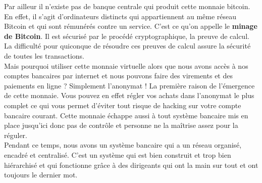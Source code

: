 Par ailleur il n’existe pas de banque centrale qui produit cette monnaie bitcoin. En effet, il s’agit d’ordinateurs distincts qui appartiennent au même réseau Bitcoin et qui sont rémunérés contre un service. C’est ce qu’on appelle le \textbf{minage de Bitcoin}. Il est sécurisé par le procédé cryptographique, la preuve de calcul. La difficulté pour quiconque de résoudre ces preuves de calcul assure la sécurité de toutes les transactions.\\

Mais pourquoi utiliser cette monnaie virtuelle alors que nous avons accès à nos comptes bancaires par internet et nous pouvons faire des virements et des paiements en ligne ?
Simplement l’anonymat ! La première raison de l’émergence de cette monnaie. Vous pouvez en effet régler vos achats dans l’anonymat le plus complet ce qui vous permet d’éviter tout risque de hacking sur votre compte bancaire courant. Cette monnaie échappe aussi à tout système bancaire mis en place jusqu’ici  donc pas de contrôle et personne ne la maîtrise assez pour la réguler.\\

Pendant ce temps, nous avons un système bancaire qui a un réseau organisé, encadré et  centralisé. C’est un système qui est bien construit et trop bien hiérarchisé et qui fonctionne grâce à des dirigeants qui ont la main sur tout et ont toujours le dernier mot. 

